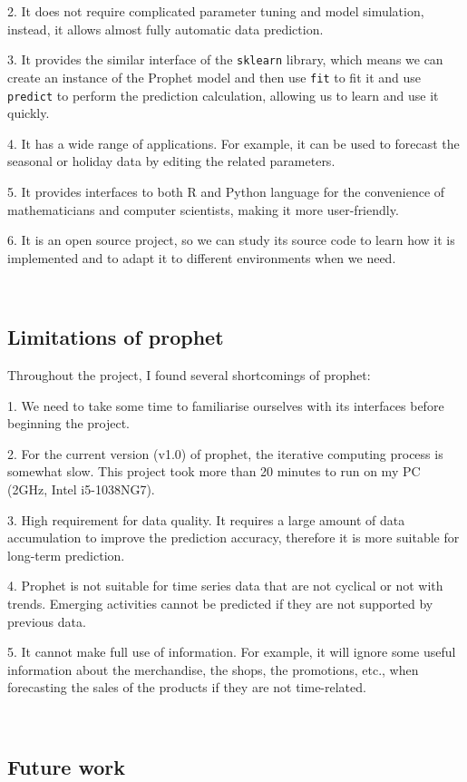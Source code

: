 \documentclass{article}
\begin{document}
2. It does not require complicated parameter tuning and model simulation, instead, it allows almost fully automatic data prediction. 

3. It provides the similar interface of the \verb|sklearn| library, which means we can create an instance of the Prophet model and then use \verb|fit| to fit it and use \verb|predict| to perform the prediction calculation, allowing us to learn and use it quickly.

4. It has a wide range of applications. For example, it can be used to forecast the seasonal or holiday data by editing the related parameters.

5. It provides interfaces to both R and Python language for the convenience of mathematicians and computer scientists, making it more user-friendly.

6. It is an open source project, so we can study its source code to learn how it is implemented and to adapt it to different environments when we need.

\ 

\subsection{Limitations of prophet}

Throughout the project, I found several shortcomings of prophet:

1. We need to take some time to familiarise ourselves with its interfaces before beginning the project.

2. For the current version (v1.0) of prophet, the iterative computing process is somewhat slow. This project took more than 20 minutes to run on my PC (2GHz, Intel i5-1038NG7).

3. High requirement for data quality. It requires a large amount of data accumulation to improve the prediction accuracy, therefore it is more suitable for long-term prediction.

4. Prophet is not suitable for time series data that are not cyclical or not with trends. Emerging activities cannot be predicted if they are not supported by previous data.

5. It cannot make full use of information. For example, it will ignore some useful information about the merchandise, the shops, the promotions, etc., when forecasting the sales of the products if they are not time-related.

\ 

\subsection{Future work}
\end{document}
